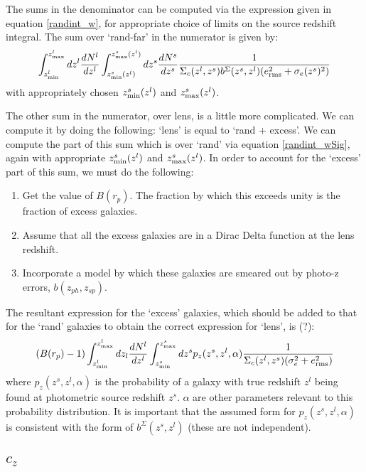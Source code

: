 \documentclass[onecolumn,amsmath,aps,fleqn, superscriptaddress]{revtex4}
\begin{document}
The sums in the denominator can be computed via the expression given in equation \ref{randint_w}, for appropriate choice of limits on the source redshift integral. The sum over `rand-far' in the numerator is given by:
\begin{equation}
\int_{z^l_{\rm min}}^{z^l_{\rm max}}dz^l \frac{dN^l}{dz^l} \int_{z^s_{\rm min}(z^l)}^{z^s_{\rm max}(z^l)}dz^s \frac{dN^s}{dz^s} \frac{1}{\Sigma_c(z^l , z^s) b^{\Sigma}(z^s,z^l) (e_{\rm rms}^2 + \sigma_e(z^s)^2)}
\label{randint_wSig}
\end{equation}
with appropriately chosen $z^s_{\rm min}(z^l)$ and $z^s_{\rm max}(z^l)$. 

The other sum in the numerator, over lens, is a little more complicated. We can compute it by doing the following: `lens' is equal to `rand + excess'. We can compute the part of this sum which is over `rand' via equation \ref{randint_wSig}, again with appropriate $z^s_{\rm min}(z^l)$ and $z^s_{\rm max}(z^l)$. In order to account for the `excess' part of this sum, we must do the following:
\begin{enumerate}
\item{Get the value of $B(r_p)$. The fraction by which this exceeds unity is the fraction of excess galaxies.}
\item{Assume that all the excess galaxies are in a Dirac Delta function at the lens redshift.}
\item{Incorporate a model by which these galaxies are smeared out by photo-z errors, $b(z_{ph}, z_{sp})$.}
\end{enumerate}

The resultant expression for the `excess' galaxies, which should be added to that for the `rand' galaxies to obtain the correct expression for `lens', is (?):
\begin{equation}
(B(r_p)-1) \int_{z_{\rm min}^l}^{z_{\rm max}^l} dz_l \frac{dN^l}{dz^l}\int_{z_{\rm min}^s}^{z_{\rm max}^s} dz^s p_z(z^s, z^l, \alpha) \frac{1}{\Sigma_c(z^l, z^s)(\sigma_e^2 +e_{\rm rms}^2)}
\end{equation}
where $p_z(z^s, z^l, \alpha)$ is the probability of a galaxy with true redshift $z^l$ being found at photometric source redshift $z^s$. $\alpha$ are other parameters relevant to this probability distribution. It is important that the assumed form for $p_z(z^s, z^l, \alpha)$ is consistent with the form of $b^\Sigma(z^s, z^l)$ (these are not independent).

\subsection*{$c_z$}
\end{document}
